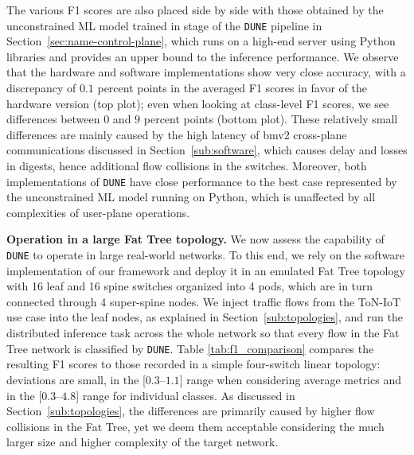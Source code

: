 \documentclass[journal]{IEEEtran}
\theoremstyle{plain} %
\newcommand*\numO[1]{\raisebox{.5pt}{\textcircled{\raisebox{-.9pt} {#1}}}}
\newcommand{\name}{\texttt{\fontsize{9}{11}\selectfont DUNE}\xspace}
\begin{document}
The various F1 scores are also placed side by side with those obtained by the unconstrained ML model trained in stage \numO{1} of the \name pipeline in Section~\ref{sec:name-control-plane}, which runs on a high-end server using Python libraries and provides an upper bound to the inference performance.
We observe that the hardware and software implementations show very close accuracy, with a discrepancy of $0.1$ percent points in the averaged F1 scores in favor of the hardware version (top plot); even when looking at class-level F1 scores, we see differences between $0$ and $9$ percent points (bottom plot). These relatively small differences are mainly caused by the high latency of bmv2 cross-plane communications discussed in Section~\ref{sub:software}, which causes delay and losses in digests, hence additional flow collisions in the switches.
Moreover, both implementations of \name have close performance to the best case represented by the unconstrained ML model running on Python, which is unaffected by all complexities of user-plane operations.


\textbf{Operation in a large Fat Tree topology.}
We now assess the capability of \name to operate in large real-world networks. To this end, we rely on the software implementation of our framework and deploy it in an emulated Fat Tree topology with 16 leaf and 16 spine switches organized into 4 pods, which are in turn connected through 4 super-spine nodes.
We inject traffic flows from the ToN-IoT use case into the leaf nodes, as explained in Section~\ref{sub:topologies}, and run the distributed inference task across the whole network so that every flow in the Fat Tree network is classified by \name. 
Table \ref{tab:f1_comparison} compares the resulting F1 scores to those recorded in a simple four-switch linear topology: deviations are small, in the [$0.3$--$1.1$] range when considering average metrics and in the [$0.3$--$4.8$] range for individual classes.
As discussed in Section~\ref{sub:topologies}, the differences are primarily caused by higher flow collisions in the Fat Tree, yet we deem them acceptable considering the much larger size and higher complexity of the target network.
\end{document}
